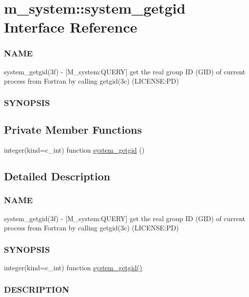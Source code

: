 \hypertarget{interfacem__system_1_1system__getgid}{}\section{m\+\_\+system\+:\+:system\+\_\+getgid Interface Reference}
\label{interfacem__system_1_1system__getgid}


\subsubsection*{N\+A\+ME}

system\+\_\+getgid(3f) -\/ \mbox{[}M\+\_\+system\+:Q\+U\+E\+RY\mbox{]} get the real group ID (G\+ID) of current process from Fortran by calling getgid(3c) (L\+I\+C\+E\+N\+SE\+:PD) \subsubsection*{S\+Y\+N\+O\+P\+S\+IS} 


\subsection*{Private Member Functions}
\begin{DoxyCompactItemize}
\item 
integer(kind=c\+\_\+int) function \mbox{\hyperlink{interfacem__system_1_1system__getgid_aa1f2ceda993e2f36bf0cdc9cf28ea1d3}{system\+\_\+getgid}} ()
\end{DoxyCompactItemize}


\subsection{Detailed Description}
\subsubsection*{N\+A\+ME}

system\+\_\+getgid(3f) -\/ \mbox{[}M\+\_\+system\+:Q\+U\+E\+RY\mbox{]} get the real group ID (G\+ID) of current process from Fortran by calling getgid(3c) (L\+I\+C\+E\+N\+SE\+:PD) \subsubsection*{S\+Y\+N\+O\+P\+S\+IS}

integer(kind=c\+\_\+int) function \mbox{\hyperlink{interfacem__system_1_1system__getgid_aa1f2ceda993e2f36bf0cdc9cf28ea1d3}{system\+\_\+getgid()}} \subsubsection*{D\+E\+S\+C\+R\+I\+P\+T\+I\+ON}

